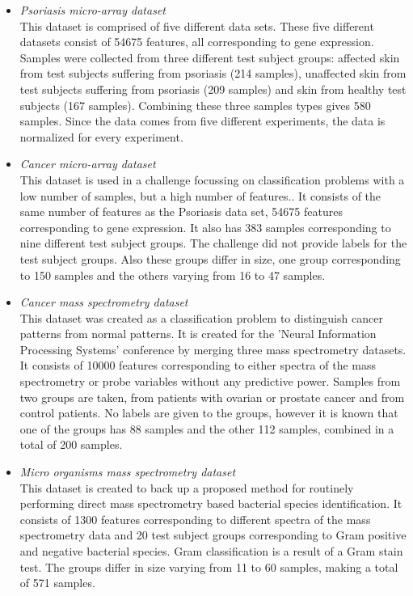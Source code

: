 	\begin{itemize}
		\item \textit{Psoriasis micro-array dataset} \\ This dataset is comprised of five different data sets\cite{nair2009genome, suarez2012expanding, bigler2013cross, yao2008type}. These five different datasets consist of 54675 features, all corresponding to gene expression. Samples were collected from three different test subject groups: affected skin from test subjects suffering from psoriasis (214 samples), unaffected skin from test subjects suffering from psoriasis (209 samples) and skin from healthy test subjects (167 samples). Combining these three samples types gives 580 samples. Since the data comes from five different experiments, the data is normalized for every experiment.
		\item \textit{Cancer micro-array dataset} \\ This dataset is used in a challenge focussing on classification problems with a low number of samples, but a high number of features.\cite{wojnarski2010rsctc}. It consists of the same number of features as the Psoriasis data set, 54675 features corresponding to gene expression. It also has 383 samples corresponding to nine different test subject groups. The challenge did not provide labels for the test subject groups. Also these groups differ in size, one group corresponding to 150 samples and the others varying from 16 to 47 samples.
		\item \textit{Cancer mass spectrometry dataset} \\ This dataset was created as a classification problem to distinguish cancer patterns from normal patterns\cite{NIPS2004_2728}. It is created for the 'Neural Information Processing Systems' conference by merging three mass spectrometry datasets. It consists of 10000 features corresponding to either spectra of the mass spectrometry or probe variables without any predictive power. Samples from two groups are taken, from patients with ovarian or prostate cancer and from control patients. No labels are given to the groups, however it is known that one of the groups has 88 samples and the other 112 samples, combined in a total of 200 samples.
		\item \textit{Micro organisms mass spectrometry dataset} \\ This dataset is created to back up a proposed method for routinely performing direct mass spectrometry based bacterial species identification\cite{doi:10.1093/bioinformatics/btu022}. It consists of 1300 features corresponding to different spectra of the mass spectrometry data and 20 test subject groups corresponding to Gram positive and negative bacterial species. Gram classification is a result of a Gram stain test\cite{madigan2017brock}. The groups differ in size varying from 11 to 60 samples, making a total of 571 samples.	
	\end{itemize}

